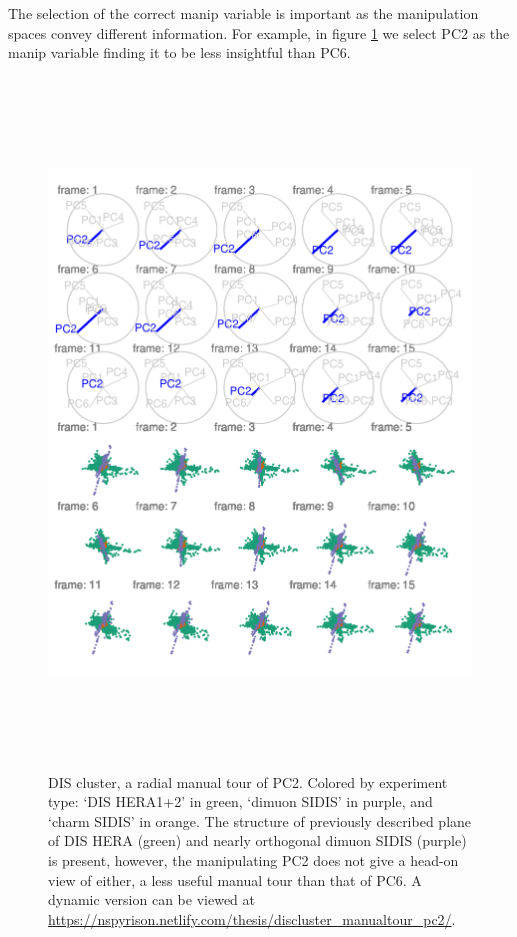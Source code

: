 \documentclass{monashthesis}
\begin{document}
The selection of the correct manip variable is important as the manipulation spaces convey different information. For example, in figure \ref{fig:DISclusterBad} we select PC2 as the manip variable finding it to be less insightful than PC6.



\begin{figure}

{\centering \includegraphics[width=6in,height=7.2in]{./figures/DISclusterBad} 

}

\caption{DIS cluster, a radial manual tour of PC2. Colored by experiment type: `DIS HERA1+2' in green, `dimuon SIDIS' in purple, and `charm SIDIS' in orange. The structure of previously described plane of DIS HERA (green) and nearly orthogonal dimuon SIDIS (purple) is present, however, the manipulating PC2 does not give a head-on view of either, a less useful manual tour than that of PC6. A dynamic version can be viewed at \url{https://nspyrison.netlify.com/thesis/discluster_manualtour_pc2/}.}\label{fig:DISclusterBad}
\end{figure}
\end{document}
